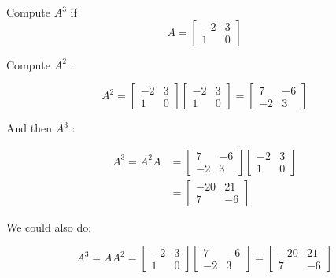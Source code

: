 \begin{example}
    Compute $A^3$ if
    \[
    A=\left[\begin{array}{rr}
    -2 & 3 \\
    1 & 0
    \end{array}\right]
    \]
\end{example}

\begin{solution}

    Compute $A^2$ :

    \[
    A^2=\left[\begin{array}{rr}
    -2 & 3 \\
    1 & 0
    \end{array}\right]\left[\begin{array}{rr}
    -2 & 3 \\
    1 & 0
    \end{array}\right]=\left[\begin{array}{rr}
    7 & -6 \\
    -2 & 3
    \end{array}\right]
    \]

    And then $A^3$ :

    \[
    \begin{aligned}
    A^3=A^2 A & =\left[\begin{array}{rr}
    7 & -6 \\
    -2 & 3
    \end{array}\right]\left[\begin{array}{rr}
    -2 & 3 \\
    1 & 0
    \end{array}\right] \\
    & =\left[\begin{array}{rr}
    -20 & 21 \\
    7 & -6
    \end{array}\right]
    \end{aligned}
    \]

    We could also do:

    \[
    A^3=A A^2=\left[\begin{array}{rr}
    -2 & 3 \\
    1 & 0
    \end{array}\right]\left[\begin{array}{rr}
    7 & -6 \\
    -2 & 3
    \end{array}\right]=\left[\begin{array}{rr}
    -20 & 21 \\
    7 & -6
    \end{array}\right]
    \]

\end{solution}

